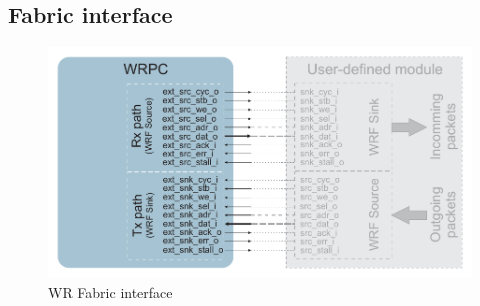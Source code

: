 \newpage
\subsection{Fabric interface}

\begin{figure}[ht]
  \begin{center}
    \includegraphics[width=\textwidth]{fig/wrpc_fabric.pdf}
    \caption{WR Fabric interface}
  \end{center}
\end{figure}


